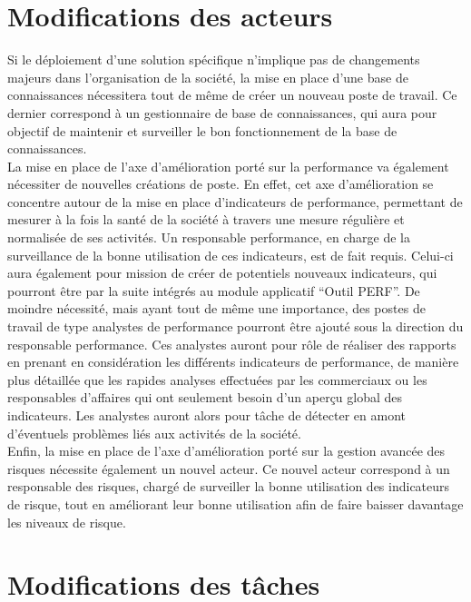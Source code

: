 \section{Modifications des acteurs}

Si le déploiement d’une solution spécifique n’implique pas de changements majeurs dans l’organisation de la société, la mise en place d’une base de connaissances nécessitera tout de même de créer un nouveau poste de travail. Ce dernier correspond à un gestionnaire de base de connaissances, qui aura pour objectif de maintenir et surveiller le bon fonctionnement de la base de connaissances. \\

La mise en place de l’axe d’amélioration porté sur la performance va également nécessiter de nouvelles créations de poste. En effet, cet axe d’amélioration se concentre autour de la mise en place d’indicateurs de performance, permettant de mesurer à la fois la santé de la société à travers une mesure régulière et normalisée de ses activités. Un responsable performance, en charge de la surveillance de la bonne utilisation de ces indicateurs, est de fait requis. Celui-ci aura également pour mission de créer de potentiels nouveaux indicateurs, qui pourront être par la suite intégrés au module applicatif “Outil PERF”. De moindre nécessité, mais ayant tout de même une importance, des postes de travail de type analystes de performance pourront être ajouté sous la direction du responsable performance. Ces analystes auront pour rôle de réaliser des rapports en prenant en considération les différents indicateurs de performance, de manière plus détaillée que les rapides analyses effectuées par les commerciaux ou les responsables d’affaires qui ont seulement besoin d’un aperçu global des indicateurs. Les analystes auront alors pour tâche de détecter en amont d’éventuels problèmes liés aux activités de la société. \\

Enfin, la mise en place de l’axe d’amélioration porté sur la gestion avancée des risques nécessite également un nouvel acteur. Ce nouvel acteur correspond à un responsable des risques, chargé de surveiller la bonne utilisation des indicateurs de risque, tout en améliorant leur bonne utilisation afin de faire baisser davantage les niveaux de risque.

\section{Modifications des tâches}

